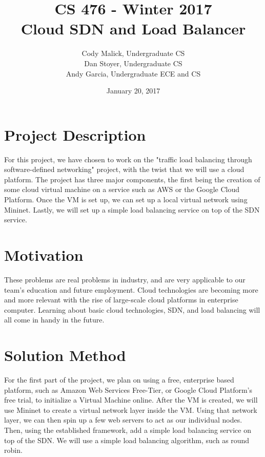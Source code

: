 \documentclass[12pt,letterpaper,onecolumn,draftclsnofoot]{IEEEtran}
\begin{document}
\begin{titlepage}
  \title{CS 476 - Winter 2017\\Cloud SDN and Load Balancer}
  \author{Cody Malick, Undergraduate CS\\ Dan Stoyer, Undergraduate CS \\
  	Andy Garcia, Undergraduate ECE and CS}
  \date{January 20, 2017}
  \maketitle
  \vspace*{1cm}
\end{titlepage}

\section{Project Description}
For this project, we have chosen to work on the "traffic load balancing through
software-defined networking" project, with the twist that we will use a cloud
platform. The project has three major components, the first being the creation
of some cloud virtual machine on a service such as AWS or the Google Cloud
Platform. Once the VM is set up, we can set up a local virtual network using
Mininet. Lastly, we will set up a simple load balancing service on top of the
SDN service.

\section{Motivation}
These problems are real problems in industry, and are very applicable to our
team's education and future employment. Cloud technologies are becoming more
and more relevant with the rise of large-scale cloud platforms in enterprise
computer. Learning about basic cloud technologies, SDN, and load balancing will
all come in handy in the future. 

\section{Solution Method}
For the first part of the project, we plan on using a free, enterprise based
platform, such as Amazon Web Services Free-Tier, or Google Cloud Platform's
free trial, to initialize a Virtual Machine online. After the VM is created,
we will use Mininet to create a virtual network layer inside the VM. Using that
network layer, we can then spin up a few web servers to act as our individual
nodes. Then, using the established framework, add a simple load balancing
service on top of the SDN. We will use a simple load balancing algorithm, such
as round robin.
\end{document}
